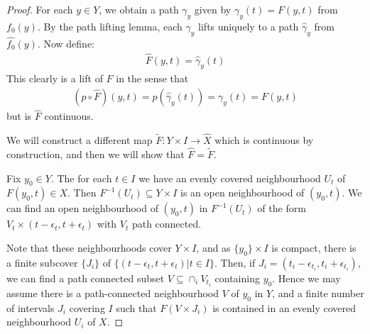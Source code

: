 \documentclass[10pt,a4paper]{article}
\begin{document}
\begin{proof}
For each $y \in Y$, we obtain a path $\gamma_y$ given by $\gamma_y(t) = F(y,t)$ from $f_0(y)$. By the path lifting lemma, each $\gamma_y$ lifts uniquely to a path $\hat{\gamma}_y$ from $\hat{f_0}(y)$. Now define:
\begin{align*}
\hat{F}(y, t) = \hat{\gamma}_y(t)
\end{align*}
This clearly is a lift of $F$ in the sense that
\begin{align*}
(p\circ \hat{F})(y,t) = p(\hat{\gamma}_y(t)) = \gamma_y(t) = F(y,t)
\end{align*}
but is $\hat{F}$ continuous.

We will construct a different map $\tilde{F}:Y\times I \to \hat{X}$ which is continuous by construction, and then we will show that $\hat{F} = \tilde{F}$.

Fix $y_0 \in Y$. The for each $t\in I$ we have an evenly covered neighbourhood $U_t$ of $F(y_0, t) \in X$. Then $F^{-1}(U_t) \subseteq Y\times I$ is an open neighbourhood of $(y_0, t)$. We can find an open neighbourhood of $(y_0, t)$ in $F^{-1}(U_t)$ of the form $V_t \times (t-\epsilon_t, t+ \epsilon_t)$ with $V_t$ path connected.

Note that these neighbourhoods cover $Y\times I$, and as $\{y_0\}\times I$ is compact, there is a finite subcover $\{J_i\}$ of $\{(t-\epsilon_t, t+\epsilon_t)| t\in I\}$. Then, if $J_i = (t_i-\epsilon_{t_i}, t_i + \epsilon_{t_i})$, we can find a path connected subset $V\subseteq \cap_i V_{t_i}$ containing $y_0$. Hence we may assume there is a path-connected neighbourhood $V$ of $y_0$ in $Y$, and a finite number of intervals $J_i$ covering $I$ such that $F(V\times J_i)$ is contained in an evenly covered neighbourhood $U_i$ of $X$.
\end{proof}
\end{document}
